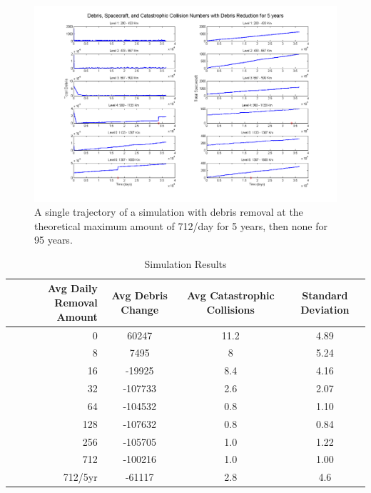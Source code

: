 \documentclass[pre,12pt]{revtex4-1}
\begin{document}
\begin{figure}
	\hspace*{-40pt}
	\includegraphics[width=1.2\linewidth]{"Figures/traj_5yr_reduce"}
	\caption{A single trajectory of a simulation with debris removal at the theoretical maximum amount of 712/day for 5 years, then none for 95 years.}
	\label{fig:traj_5yr_reduce}
\end{figure}

\begin{table}[h]
\centering
\begin{tabular}{| r | c| c| c|} \hline
	Avg Daily Removal Amount & Avg Debris Change & Avg Catastrophic Collisions & Standard Deviation \\ \hline
	0 & 60247 & 11.2 & 4.89 \\ \hline
	8 & 7495 & 8 & 5.24 \\ \hline
	16 & -19925 & 8.4 & 4.16 \\ \hline
	32 & -107733 & 2.6 & 2.07 \\ \hline
	64 & -104532 & 0.8 & 1.10 \\ \hline
	128 & -107632 & 0.8 & 0.84 \\ \hline
	256 & -105705 & 1.0 & 1.22 \\ \hline
	712 & -100216 & 1.0 & 1.00 \\ \hline
	712/5yr & -61117 & 2.8 & 4.6 \\ \hline
\end{tabular}
\caption{Simulation Results}
\label{tab:results}
\end{table}
\end{document}
